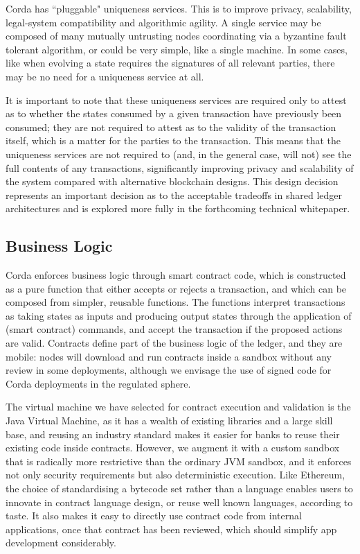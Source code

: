 \documentclass{article}
\begin{document}
Corda has ``pluggable" uniqueness services. This is to improve privacy, scalability, legal-system compatibility\cite{EUC} and algorithmic agility. A single service may be composed of many mutually untrusting nodes coordinating via a byzantine fault tolerant algorithm, or could be very simple, like a single machine. In some cases, like when evolving a state requires the signatures of all relevant parties, there may be no need for a uniqueness service at all. 

It is important to note that these uniqueness services are required only to attest as to whether the states consumed by a given transaction have previously been consumed; they are not required to attest as to the validity of the transaction itself, which is a matter for the parties to the transaction. This means that the uniqueness services are not required to (and, in the general case, will not) see the full contents of any transactions, significantly improving privacy and scalability of the system compared with alternative blockchain designs.  This design decision represents an important decision as to the acceptable tradeoffs in shared ledger architectures and is explored more fully in the forthcoming technical whitepaper.

\subsection{Business Logic}
Corda enforces business logic through smart contract code, which is constructed as a pure function that either accepts or rejects a transaction, and which can be composed from simpler, reusable functions. The functions interpret transactions as taking states as inputs and producing output states through the application of (smart contract) commands, and accept the transaction if the proposed actions are valid. Contracts define part of the business logic of the ledger, and they are mobile: nodes will download and run contracts inside a sandbox without any review in some deployments, although we envisage the use of signed code for Corda deployments in the regulated sphere. 

The virtual machine we have selected for contract execution and validation is the Java Virtual Machine\cite{JVM}, as it has a wealth of existing libraries and a large skill base, and reusing an industry standard makes it easier for banks to reuse their existing code inside contracts. However, we augment it with a custom sandbox that is radically more restrictive than the ordinary JVM sandbox, and it enforces not only security requirements but also deterministic execution. Like Ethereum, the choice of standardising a bytecode set rather than a language enables users to innovate in contract language design, or reuse well known languages, according to taste. It also makes it easy to directly use contract code from internal applications, once that contract has been reviewed, which should simplify app development considerably.
\end{document}
